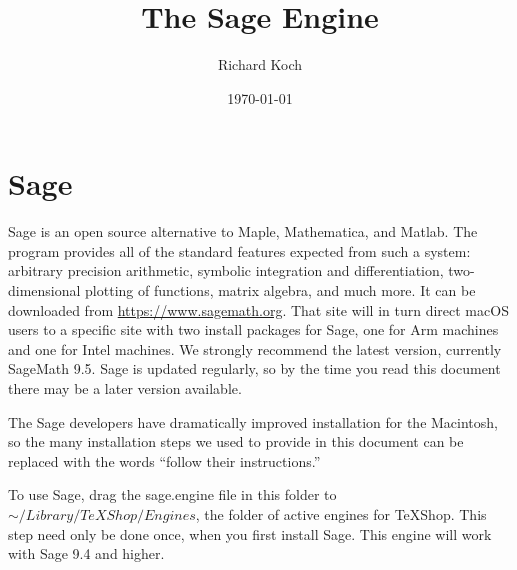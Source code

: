\documentclass[11pt, oneside]{amsart}
\title{The Sage Engine}
\author{Richard Koch}
\date{\today}
\begin{document}
\maketitle
\vspace{-.3in}
\section{Sage}
Sage is an open source alternative to Maple, Mathematica, and Matlab. The program provides all of the standard features expected from such a system: arbitrary precision arithmetic, symbolic integration and differentiation, two-dimensional plotting of functions, matrix algebra, and much more.
It can be downloaded from \url{https://www.sagemath.org}.
That site will in turn direct macOS users to a specific site with two install packages for Sage, one for Arm machines and one for Intel machines. We strongly recommend the latest version, currently SageMath 9.5. Sage is updated regularly, so by the time you read this document there may be a later version available. 


The Sage developers have dramatically improved installation for the Macintosh, so the many installation steps  we used to provide in this document can be replaced with the words ``follow their instructions.'' 

To use Sage, drag  the sage.engine file in this folder to $\sim/Library/TeXShop/Engines$, the folder of active engines for TeXShop. This step need only be done once, when you first install Sage. This engine will work with Sage 9.4 and higher.

%
%
\end{document}
